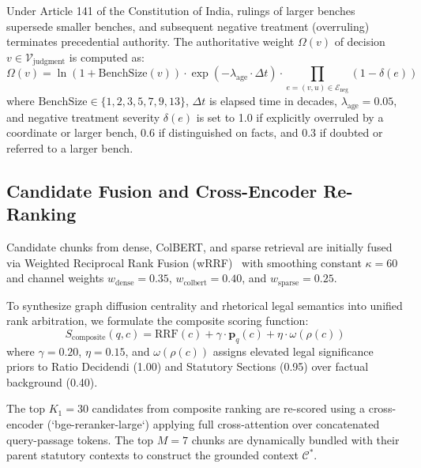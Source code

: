\documentclass[conference]{IEEEtran}
\begin{document}
Under Article 141 of the Constitution of India, rulings of larger benches supersede smaller benches, and subsequent negative treatment (overruling) terminates precedential authority. The authoritative weight $\Omega(v)$ of decision $v \in \mathcal{V}_{\text{judgment}}$ is computed as:
\begin{equation}
\Omega(v) = \ln\left(1 + \text{BenchSize}(v)\right) \cdot \exp\left(-\lambda_{\text{age}} \cdot \Delta t\right) \cdot \prod_{e = (v, u) \in \mathcal{E}_{\text{neg}}} \left(1 - \delta(e)\right)
\end{equation}
where $\text{BenchSize} \in \{1, 2, 3, 5, 7, 9, 13\}$, $\Delta t$ is elapsed time in decades, $\lambda_{\text{age}} = 0.05$, and negative treatment severity $\delta(e)$ is set to 1.0 if explicitly overruled by a coordinate or larger bench, 0.6 if distinguished on facts, and 0.3 if doubted or referred to a larger bench.

\subsection{Candidate Fusion and Cross-Encoder Re-Ranking}
Candidate chunks from dense, ColBERT, and sparse retrieval are initially fused via Weighted Reciprocal Rank Fusion (wRRF)~\cite{cormack2009reciprocal} with smoothing constant $\kappa = 60$ and channel weights $w_{\text{dense}} = 0.35$, $w_{\text{colbert}} = 0.40$, and $w_{\text{sparse}} = 0.25$.

To synthesize graph diffusion centrality and rhetorical legal semantics into unified rank arbitration, we formulate the composite scoring function:
\begin{equation}
S_{\text{composite}}(q, c) = \text{RRF}(c) + \gamma \cdot \mathbf{p}_q(c) + \eta \cdot \omega(\rho(c))
\end{equation}
where $\gamma = 0.20$, $\eta = 0.15$, and $\omega(\rho(c))$ assigns elevated legal significance priors to Ratio Decidendi (1.00) and Statutory Sections (0.95) over factual background (0.40).

The top $K_1 = 30$ candidates from composite ranking are re-scored using a cross-encoder (`bge-reranker-large`) applying full cross-attention over concatenated query-passage tokens. The top $M = 7$ chunks are dynamically bundled with their parent statutory contexts to construct the grounded context $\mathcal{C}^*$.
\end{document}
